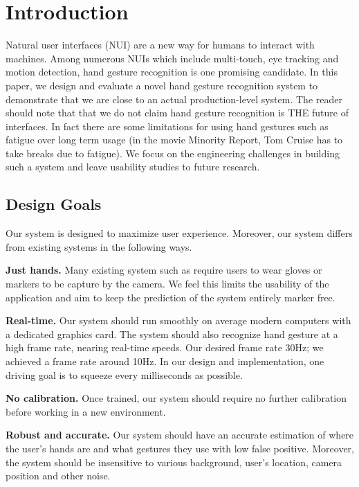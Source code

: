 \section{Introduction}
\label{sec: intro}
\cutsection

Natural user interfaces (NUI) are a new way for humans to interact with machines. Among numerous NUIs which include multi-touch, eye tracking and motion detection, hand gesture recognition is one promising candidate. In this paper, we design and evaluate a novel hand gesture recognition system to demonstrate that we are close to an actual production-level system. The reader should note that that we do not claim hand gesture recognition is THE future of interfaces. In fact there are some limitations for using hand gestures such as fatigue over long term usage (in the movie Minority Report, Tom Cruise has to take breaks due to fatigue). We focus on the engineering challenges in building such a system and leave usability studies to future research.

\cutsection
\subsection{Design Goals}
\cutsection
Our system is designed to maximize user experience. Moreover, our system differs from existing systems in the following ways.

\textbf{Just hands.} Many existing system such as \cite{mistry, minority, wang2009} require users to wear gloves or markers to be capture by the camera. We feel this limits the usability of the application and aim to keep the prediction of the system entirely marker free.
  
\textbf{Real-time.} Our system should run smoothly on average modern computers with a dedicated graphics card. The system should also recognize hand gesture at a high frame rate, nearing real-time speeds. Our desired frame rate 30Hz; we achieved a frame rate around 10Hz. In our design and implementation, one driving goal is to squeeze every milliseconds as possible. 

\textbf{No calibration.}  Once trained, our system should require no further calibration before working in a new environment. 

\textbf{Robust and accurate.} Our system should have an accurate estimation of where the user's hands are and what gestures they use with low false positive. Moreover, the system should be insensitive to various background, user's location, camera position and other noise. 

